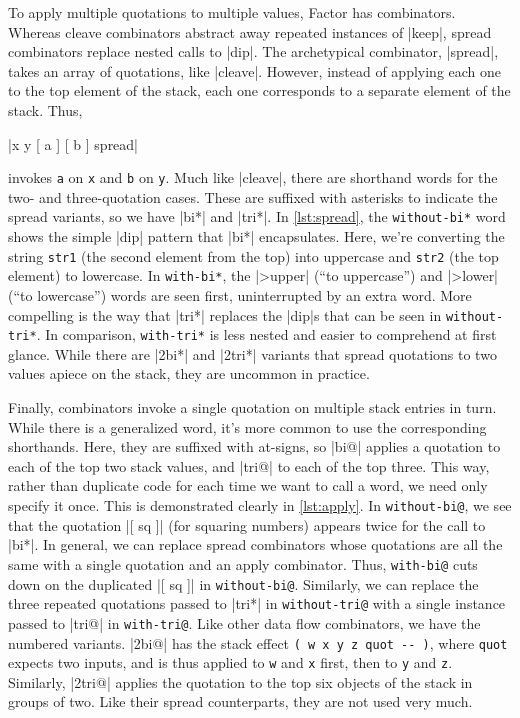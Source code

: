 \begin{sloppypar}
To apply multiple quotations to multiple values, Factor has 
combinators.  Whereas cleave combinators abstract away repeated instances of
\factor|keep|, spread combinators replace nested calls to \factor|dip|.  The
archetypical combinator, \factor|spread|, takes an array of quotations, like
\factor|cleave|.  However, instead of applying each one to the top element of
the stack, each one corresponds to a separate element of the stack.  Thus,
%
\begin{center} \factor|x y { [ a ] [ b ] } spread| \end{center}
%
invokes \Verb|a| on \Verb|x| and \Verb|b| on \Verb|y|.  Much like
\factor|cleave|, there are shorthand words for the two- and three-quotation
cases.  These are suffixed with asterisks to indicate the spread variants, so
we have \factor|bi*| and \factor|tri*|.  In \vref{lst:spread}, the
\Verb|without-bi*| word shows the simple \factor|dip| pattern that \factor|bi*|
encapsulates.  Here, we're converting the string \Verb|str1| (the second
element from the top) into uppercase and \Verb|str2| (the top element) to
lowercase.  In \Verb|with-bi*|, the \factor|>upper| (``to uppercase'') and
\factor|>lower| (``to lowercase'') words are seen first, uninterrupted by an
extra word.  More compelling is the way that \factor|tri*| replaces the
\factor|dip|s that can be seen in \Verb|without-tri*|.  In comparison,
\Verb|with-tri*| is less nested and easier to comprehend at first glance.
While there are \factor|2bi*| and \factor|2tri*| variants that spread
quotations to two values apiece on the stack, they are uncommon in practice.
\end{sloppypar}


Finally,  combinators invoke a single quotation on multiple stack
entries in turn.  While there is a generalized word, it's more common to use
the corresponding shorthands.  Here, they are suffixed with at-signs, so
\factor|bi@| applies a quotation to each of the top two stack values, and
\factor|tri@| to each of the top three.  This way, rather than duplicate code
for each time we want to call a word, we need only specify it once.  This is
demonstrated clearly in \vref{lst:apply}.  In \Verb|without-bi@|, we see that
the quotation \factor|[ sq ]| (for squaring numbers) appears twice for the call
to \factor|bi*|.  In general, we can replace spread combinators whose
quotations are all the same with a single quotation and an apply combinator.
Thus, \Verb|with-bi@| cuts down on the duplicated \factor|[ sq ]| in
\Verb|without-bi@|.  Similarly, we can replace the three repeated quotations
passed to \factor|tri*| in \Verb|without-tri@| with a single instance passed
to \factor|tri@| in \Verb|with-tri@|.  Like other data flow combinators, we
have the numbered variants.  \factor|2bi@| has the stack effect
%
\Verb|( w x y z quot -- )|,
%
where \Verb|quot| expects two inputs, and is thus applied to \Verb|w| and
\Verb|x| first, then to \Verb|y| and \Verb|z|.  Similarly, \factor|2tri@|
applies the quotation to the top six objects of the stack in groups of two.
Like their spread counterparts, they are not used very much.

